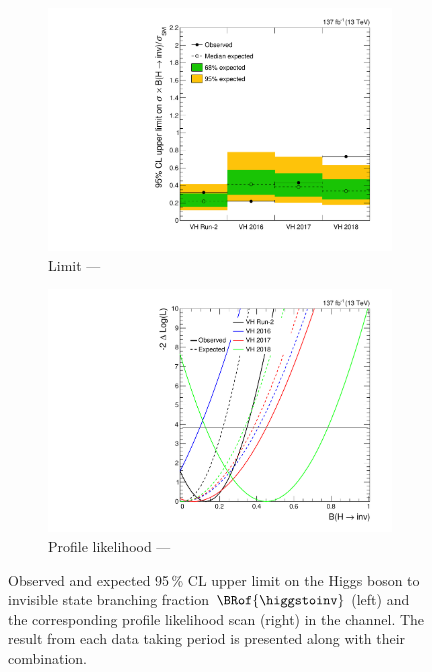 \begin{figure}[htbp]
    \centering
    \begin{subfigure}[t]{0.49\textwidth}
        \includegraphics[width=\textwidth]{figures/limits/VH/limit_Run2_VH.pdf}
        \caption{Limit --- \VH}
    \end{subfigure}
    \hfill
    \begin{subfigure}[t]{0.49\textwidth}
        \includegraphics[width=\textwidth]{figures/likelihood_scan/profile_likelihood_scan_Run2_VH.pdf}
        \caption{Profile likelihood --- \VH}
    \end{subfigure}
    \caption[Observed and expected 95\,\% CL upper limit on the Higgs boson to invisible state branching fraction $\BRof{\higgstoinv}$ (left) and the corresponding profile likelihood scan (right) in the \VH channel]{Observed and expected 95\,\% CL upper limit on the Higgs boson to invisible state branching fraction $\BRof{\higgstoinv}$ (left) and the corresponding profile likelihood scan (right) in the \VH channel. The result from each data taking period is presented along with their combination.}
    \label{fig:htoinv_limit_VH}
\end{figure}

